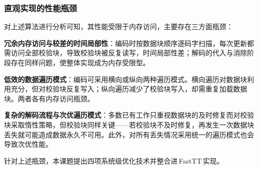 \FloatBarrier

\subsubsection{直观实现的性能瓶颈}

对上述算法进行分析可知，其性能受限于内存访问，主要存在三方面瓶颈：

\begin{semiQuotList}
    \item \textbf{冗余内存访问与较差的时间局部性}：编码时按数据块顺序逐码字扫描，每次更新都需访问全部校验块，导致校验块被反复读写，时间局部性差；解码的代入与消除阶段存在同样问题，使整体实现成为内存受限型。
    \item \textbf{低效的数据遍历模式}：编码可采用横向或纵向两种遍历模式。横向遍历对数据块利用充分，但对校验块反复写入；纵向遍历减少了校验块写入，却需重复加载数据块。两者各有内存访问瓶颈。
    \item \textbf{复杂的解码流程与次优遍历模式}：多数已有工作只重视数据块的及时修复而对校验块采取惰性策略，但校验块同样关键——若校验块不及时修复，再发生一次数据块丢失就可能造成数据永久不可用。此外，对所有丢失情况采用统一的遍历模式也会导致次优性能。
\end{semiQuotList}

针对上述瓶颈，本课题提出四项系统级优化技术并整合进\,FastTT\,实现。

\FloatBarrier

